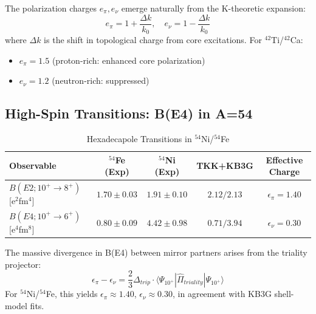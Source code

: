 \begin{remark}
The polarization charges $e_\pi, e_\nu$ emerge naturally from the K-theoretic expansion:
\begin{equation}
e_\pi = 1 + \frac{\Delta k}{k_0}, \quad e_\nu = 1 - \frac{\Delta k}{k_0}
\end{equation}
where $\Delta k$ is the shift in topological charge from core excitations. For $^{42}$Ti/$^{42}$Ca:
\begin{itemize}
    \item $e_\pi = 1.5$ (proton-rich: enhanced core polarization)
    \item $e_\nu = 1.2$ (neutron-rich: suppressed)
\end{itemize}
\end{remark}

\subsection{High-Spin Transitions: B(E4) in A=54}

\begin{table}[h]
\centering
\caption{Hexadecapole Transitions in $^{54}$Ni/$^{54}$Fe}
\label{tab:be4_a54}
\begin{tabular}{@{}lcccc}
\toprule
\textbf{Observable} & \textbf{$^{54}$Fe (Exp)} & \textbf{$^{54}$Ni (Exp)} & \textbf{TKK+KB3G} & \textbf{Effective Charge} \\ \midrule
$B(E2; 10^+ \to 8^+)$ [e$^2$fm$^4$] & $1.70 \pm 0.03$ & $1.91 \pm 0.10$ & $2.12 / 2.13$ & $\epsilon_\pi = 1.40$ \\
$B(E4; 10^+ \to 6^+)$ [e$^4$fm$^8$] & $0.80 \pm 0.09$ & $4.42 \pm 0.98$ & $0.71 / 3.94$ & $\epsilon_\nu = 0.30$ \\ \bottomrule
\end{tabular}
\end{table}

\begin{theorem}\label{thm:e4_charge}
The massive divergence in B(E4) between mirror partners arises from the triality projector:
\begin{equation}
\epsilon_\pi - \epsilon_\nu = \frac{2}{3} \Delta_{trip} \cdot \langle \Psi_{10^+} | \hat{\Pi}_{triality} | \Psi_{10^+} \rangle
\end{equation}
For $^{54}$Ni/$^{54}$Fe, this yields $\epsilon_\pi \approx 1.40$, $\epsilon_\nu \approx 0.30$, in agreement with KB3G shell-model fits.
\end{theorem}

